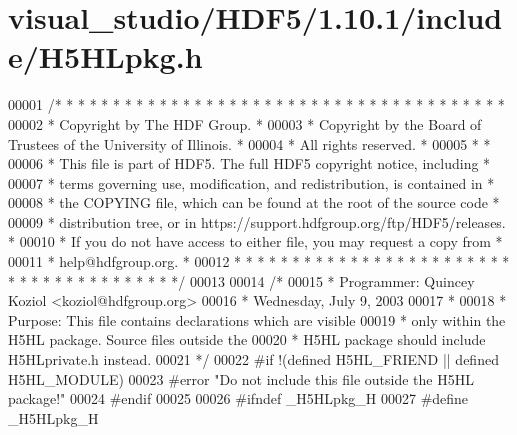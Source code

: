 \hypertarget{visual__studio_2_h_d_f5_21_810_81_2include_2_h5_h_lpkg_8h_source}{}\section{visual\+\_\+studio/\+H\+D\+F5/1.10.1/include/\+H5\+H\+Lpkg.h}
\label{visual__studio_2_h_d_f5_21_810_81_2include_2_h5_h_lpkg_8h_source}

\begin{DoxyCode}
00001 \textcolor{comment}{/* * * * * * * * * * * * * * * * * * * * * * * * * * * * * * * * * * * * * * *}
00002 \textcolor{comment}{ * Copyright by The HDF Group.                                               *}
00003 \textcolor{comment}{ * Copyright by the Board of Trustees of the University of Illinois.         *}
00004 \textcolor{comment}{ * All rights reserved.                                                      *}
00005 \textcolor{comment}{ *                                                                           *}
00006 \textcolor{comment}{ * This file is part of HDF5.  The full HDF5 copyright notice, including     *}
00007 \textcolor{comment}{ * terms governing use, modification, and redistribution, is contained in    *}
00008 \textcolor{comment}{ * the COPYING file, which can be found at the root of the source code       *}
00009 \textcolor{comment}{ * distribution tree, or in https://support.hdfgroup.org/ftp/HDF5/releases.  *}
00010 \textcolor{comment}{ * If you do not have access to either file, you may request a copy from     *}
00011 \textcolor{comment}{ * help@hdfgroup.org.                                                        *}
00012 \textcolor{comment}{ * * * * * * * * * * * * * * * * * * * * * * * * * * * * * * * * * * * * * * */}
00013 
00014 \textcolor{comment}{/*}
00015 \textcolor{comment}{ * Programmer: Quincey Koziol <koziol@hdfgroup.org>}
00016 \textcolor{comment}{ *             Wednesday, July 9, 2003}
00017 \textcolor{comment}{ *}
00018 \textcolor{comment}{ * Purpose:     This file contains declarations which are visible}
00019 \textcolor{comment}{ *              only within the H5HL package. Source files outside the}
00020 \textcolor{comment}{ *              H5HL package should include H5HLprivate.h instead.}
00021 \textcolor{comment}{ */}
00022 \textcolor{preprocessor}{#if !(defined H5HL\_FRIEND || defined H5HL\_MODULE)}
00023 \textcolor{preprocessor}{#error "Do not include this file outside the H5HL package!"}
00024 \textcolor{preprocessor}{#endif}
00025 
00026 \textcolor{preprocessor}{#ifndef \_H5HLpkg\_H}
00027 \textcolor{preprocessor}{#define \_H5HLpkg\_H}

\end{DoxyCode}
